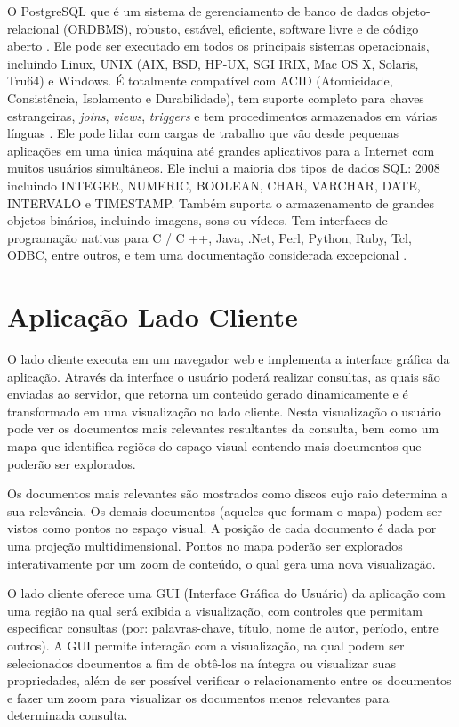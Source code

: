 O PostgreSQL que é um sistema de gerenciamento de banco de dados objeto-relacional (ORDBMS), robusto, estável, eficiente, software livre e de código aberto \cite{obe2014postgresql} \cite{posgresql_documentation}. Ele pode ser executado em todos os principais sistemas operacionais, incluindo Linux, UNIX (AIX, BSD, HP-UX, SGI IRIX, Mac OS X, Solaris, Tru64) e Windows. É totalmente compatível com ACID (Atomicidade, Consistência, Isolamento e Durabilidade), tem suporte completo para chaves estrangeiras, \textit{joins}, \textit{views}, \textit{triggers} e tem procedimentos armazenados em várias línguas \cite{posgresql_documentation}\cite{obe2014postgresql}.  Ele pode lidar com cargas de trabalho que vão desde pequenas aplicações em uma única máquina até grandes aplicativos para a Internet com muitos usuários simultâneos.
 Ele inclui a maioria dos tipos de dados SQL: 2008 incluindo INTEGER, NUMERIC, BOOLEAN, CHAR, VARCHAR, DATE, INTERVALO e TIMESTAMP. Também suporta o armazenamento de grandes objetos binários, incluindo imagens, sons ou vídeos. Tem interfaces de programação nativas para C / C ++, Java, .Net, Perl, Python, Ruby, Tcl, ODBC, entre outros, e tem uma documentação considerada excepcional \cite{obe2014postgresql}.


\section{Aplicação Lado Cliente}

O lado cliente executa em um navegador web e implementa a interface gráfica da aplicação. Através da interface o usuário poderá realizar consultas, as quais são enviadas ao servidor, que retorna um conteúdo gerado dinamicamente e é transformado em uma visualização no lado cliente.
Nesta visualização o usuário pode ver os documentos mais relevantes resultantes da consulta, bem como um mapa que identifica regiões do espaço visual contendo mais documentos que poderão ser explorados.

Os documentos mais relevantes são mostrados como discos cujo raio determina a sua relevância. Os demais documentos (aqueles que formam o mapa) podem ser vistos como pontos no espaço visual. A posição de cada documento é dada por uma projeção multidimensional. Pontos no mapa poderão ser explorados interativamente por um zoom de conteúdo, o qual gera uma nova visualização.

O lado cliente oferece uma GUI (Interface Gráfica do Usuário) da aplicação com uma região na qual será exibida a visualização, com controles que permitam especificar consultas (por: palavras-chave, título, nome de autor, período, entre outros). A GUI permite interação com a visualização, na qual podem ser selecionados documentos a fim de obtê-los na íntegra ou visualizar suas propriedades, além de ser possível verificar o relacionamento entre os documentos e fazer um zoom para visualizar os documentos menos relevantes para determinada consulta.

